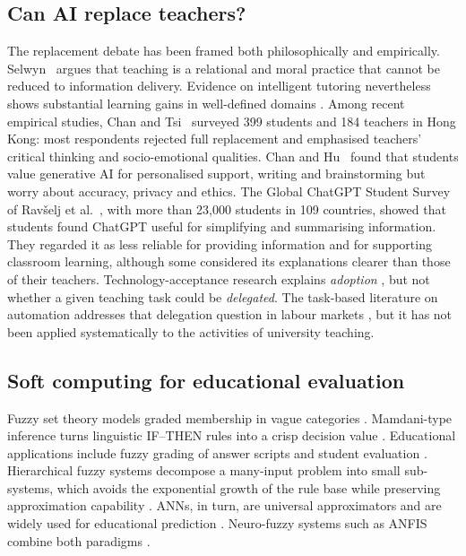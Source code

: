 \documentclass[fleqn,10pt]{wlscirep}
\theoremstyle{remark}
\begin{document}
\subsection{Can AI replace teachers?}
The replacement debate has been framed both philosophically and empirically. Selwyn~\cite{selwyn2019} argues that teaching is a relational and moral practice that cannot be reduced to information delivery. Evidence on intelligent tutoring nevertheless shows substantial learning gains in well-defined domains \cite{vanlehn2011,kulik2016}. Among recent empirical studies, Chan and Tsi~\cite{chantsi2024} surveyed 399 students and 184 teachers in Hong Kong: most respondents rejected full replacement and emphasised teachers' critical thinking and socio-emotional qualities. Chan and Hu~\cite{chanhu2023} found that students value generative AI for personalised support, writing and brainstorming but worry about accuracy, privacy and ethics. The Global ChatGPT Student Survey of Ravšelj et al.~\cite{ravselj2025}, with more than 23,000 students in 109 countries, showed that students found ChatGPT useful for simplifying and summarising information. They regarded it as less reliable for providing information and for supporting classroom learning, although some considered its explanations clearer than those of their teachers. Technology-acceptance research explains \emph{adoption} \cite{venkatesh2003}, but not whether a given teaching task could be \emph{delegated}. The task-based literature on automation addresses that delegation question in labour markets \cite{autor2003,frey2017,eloundou2024}, but it has not been applied systematically to the activities of university teaching.

\subsection{Soft computing for educational evaluation}
Fuzzy set theory models graded membership in vague categories \cite{zadeh1965}. Mamdani-type inference turns linguistic IF--THEN rules into a crisp decision value \cite{mamdani1975,ross2010}. Educational applications include fuzzy grading of answer scripts and student evaluation \cite{biswas1995,chenlee1999}. Hierarchical fuzzy systems decompose a many-input problem into small sub-systems, which avoids the exponential growth of the rule base while preserving approximation capability \cite{wang1998}. ANNs, in turn, are universal approximators \cite{hornik1989} and are widely used for educational prediction \cite{romero2020}. Neuro-fuzzy systems such as ANFIS combine both paradigms \cite{jang1993}.
\end{document}
